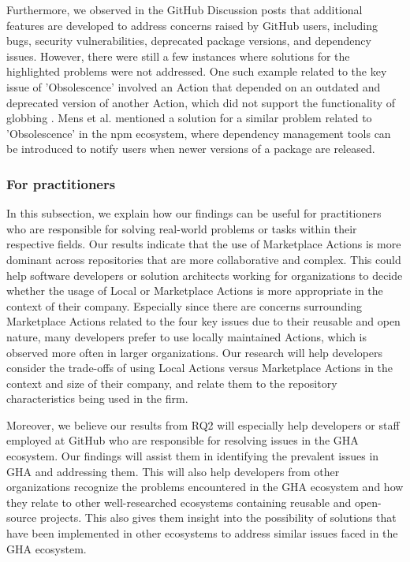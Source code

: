\documentclass[conference]{IEEEtran}
\begin{document}
	Furthermore, we observed in the GitHub Discussion posts that additional features are developed to address concerns raised by GitHub users, including bugs, security vulnerabilities, deprecated package versions, and dependency issues. However, there were still a few instances where solutions for the highlighted problems were not addressed. One such example related to the key issue of 'Obsolescence' involved an Action that depended on an outdated and deprecated version of another Action, which did not support the functionality of globbing \cite{graysuit2024}. Mens et al. \cite{decan2018evolution} mentioned a solution for a similar problem related to 'Obsolescence' in the npm ecosystem, where dependency management tools can be introduced to notify users when newer versions of a package are released.\\

\subsubsection{\textbf{For practitioners}} In this subsection, we explain how our findings can be useful for practitioners who are responsible for solving real-world problems or tasks within their respective fields. Our results indicate that the use of Marketplace Actions is more dominant across repositories that are more collaborative and complex. This could help software developers or solution architects working for organizations to decide whether the usage of Local or Marketplace Actions is more appropriate in the context of their company. Especially since there are concerns surrounding Marketplace Actions related to the four key issues due to their reusable and open nature, many developers prefer to use locally maintained Actions, which is observed more often in larger organizations. Our research will help developers consider the trade-offs of using Local Actions versus Marketplace Actions in the context and size of their company, and relate them to the repository characteristics being used in the firm.

	Moreover, we believe our results from RQ2 will especially help developers or staff employed at GitHub who are responsible for resolving issues in the GHA ecosystem. Our findings will assist them in identifying the prevalent issues in GHA and addressing them. This will also help developers from other organizations recognize the problems encountered in the GHA ecosystem and how they relate to other well-researched ecosystems containing reusable and open-source projects. This also gives them insight into the possibility of solutions that have been implemented in other ecosystems to address similar issues faced in the GHA ecosystem.
\end{document}
